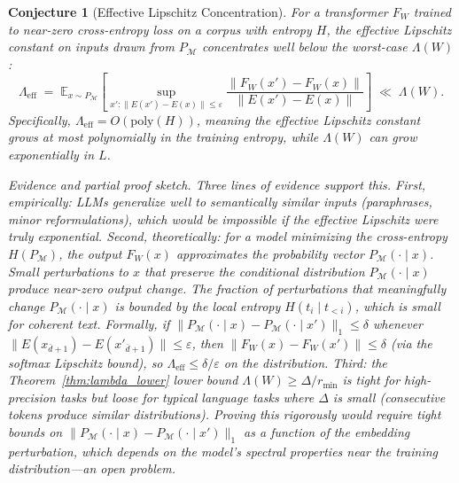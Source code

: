 \documentclass[11pt]{article}
\newtheorem{conjecture}{Conjecture}
\begin{document}
\begin{conjecture}[Effective Lipschitz Concentration]
\label{conj:effective_lambda}
For a transformer $F_W$ trained to near-zero cross-entropy loss on a corpus
with entropy $H$, the \emph{effective} Lipschitz constant on inputs drawn from
$P_{\mathcal{M}}$ concentrates well below the worst-case $\Lambda(W)$:
\[
  \Lambda_{\mathrm{eff}} \;=\;
  \mathbb{E}_{x \sim P_{\mathcal{M}}}\!\left[
  \sup_{x' : \|E(x') - E(x)\| \leq \varepsilon}
  \frac{\|F_W(x') - F_W(x)\|}{\|E(x') - E(x)\|}
  \right]
  \;\ll\; \Lambda(W).
\]
Specifically, $\Lambda_{\mathrm{eff}} = O(\mathrm{poly}(H))$, meaning the effective
Lipschitz constant grows at most polynomially in the training entropy, while
$\Lambda(W)$ can grow exponentially in $L$.

\emph{Evidence and partial proof sketch.}
Three lines of evidence support this.  First, empirically: LLMs generalize
well to semantically similar inputs (paraphrases, minor reformulations), which
would be impossible if the effective Lipschitz were truly exponential.
Second, theoretically: for a model minimizing the cross-entropy $H(P_{\mathcal{M}})$,
the output $F_W(x)$ approximates the probability vector $P_{\mathcal{M}}(\cdot \mid x)$.
Small perturbations to $x$ that preserve the conditional distribution
$P_{\mathcal{M}}(\cdot \mid x)$ produce near-zero output change.  The fraction
of perturbations that meaningfully change $P_{\mathcal{M}}(\cdot \mid x)$
is bounded by the local entropy $H(t_i \mid t_{<i})$, which is small for
coherent text.  Formally, if $\|P_{\mathcal{M}}(\cdot \mid x) -
P_{\mathcal{M}}(\cdot \mid x')\|_1 \leq \delta$ whenever $\|E(x_{\bar{d}+1}) -
E(x'_{\bar{d}+1})\| \leq \varepsilon$, then $\|F_W(x) - F_W(x')\| \leq \delta$
(via the softmax Lipschitz bound), so $\Lambda_{\mathrm{eff}} \leq
\delta/\varepsilon$ on the distribution.  Third: the Theorem~\ref{thm:lambda_lower}
lower bound $\Lambda(W) \geq \Delta/r_{\min}$ is tight for high-precision tasks
but loose for typical language tasks where $\Delta$ is small (consecutive
tokens produce similar distributions).  Proving this rigorously would require
tight bounds on $\|P_{\mathcal{M}}(\cdot \mid x) - P_{\mathcal{M}}(\cdot \mid x')\|_1$
as a function of the embedding perturbation, which depends on the model's
spectral properties near the training distribution---an open problem.
\end{conjecture}
\end{document}
